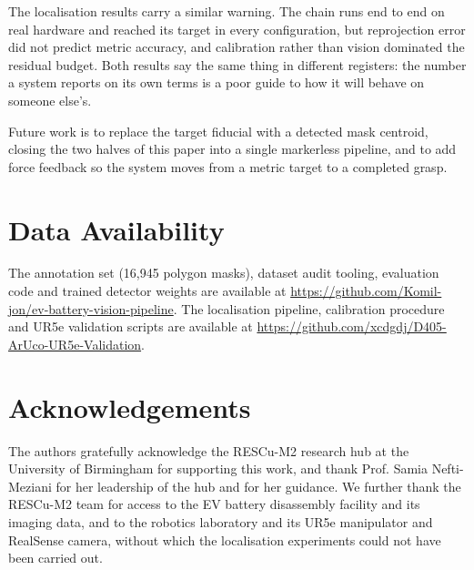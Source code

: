 \documentclass[conference]{IEEEtran}
\begin{document}
The localisation results carry a similar warning. The chain runs end to end on real
hardware and reached its target in every configuration, but reprojection error did not
predict metric accuracy, and calibration rather than vision dominated the residual
budget. Both results say the same thing in different registers: the number a system
reports on its own terms is a poor guide to how it will behave on someone else's.

Future work is to replace the target fiducial with a detected mask centroid, closing
the two halves of this paper into a single markerless pipeline, and to add force
feedback so the system moves from a metric target to a completed grasp.

\section*{Data Availability}
The annotation set (16,945 polygon masks), dataset audit tooling, evaluation code and
trained detector weights are available at
\url{https://github.com/Komil-jon/ev-battery-vision-pipeline}. The localisation
pipeline, calibration procedure and UR5e validation scripts are available at
\url{https://github.com/xcdgdj/D405-ArUco-UR5e-Validation}.

\section*{Acknowledgements}
The authors gratefully acknowledge the RESCu-M2 research hub at the University of
Birmingham for supporting this work, and thank Prof. Samia Nefti-Meziani for her
leadership of the hub and for her guidance. We further thank the RESCu-M2 team for
access to the EV battery disassembly facility and its imaging data, and to the
robotics laboratory and its UR5e manipulator and RealSense camera, without which the
localisation experiments could not have been carried out.
\end{document}
